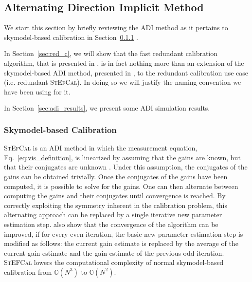 \documentclass[useAMS,usenatbib]{mn2e}
\begin{document}
\subsection{Alternating Direction Implicit Method}
\label{sec:adi}
We start this section by briefly reviewing the ADI method as it pertains to skymodel-based calibration in Section~\ref{sec:sbc} \citep{Salvini2014,Smirnov2015}.

In Section~\ref{sec:red_c}, we will show that the fast redundant calibration algorithm, that is presented in \citet{Marthi2014},
is in fact nothing more than an extension of the skymodel-based ADI method, presented in \citet{Salvini2014}, to the redundant calibration use case (i.e. redundant \textsc{StEfCal}).
In doing so we will justify the naming convention we have been using for it.

In Section~\ref{sec:adi_results}, we present some ADI simulation results. 

\subsubsection{Skymodel-based Calibration}
\label{sec:sbc}
\textsc{StEfCal} is an ADI method in which the measurement equation, Eq.~\eqref{eq:vis_definition}, is linearized by assuming that the gains are known, but
that their conjugates are unknown \citep{Mitchell:MWA-cal,Salvini2014}. Under this assumption, the conjugates of the gains can be obtained trivially. Once the conjugates of the gains have been computed, it is possible to solve for the gains. One can then alternate between computing the gains and their conjugates until convergence
is reached. By correctly exploiting the symmetry inherent in the calibration problem, this alternating approach can be replaced by a single iterative new parameter estimation step. \cite{Salvini2014} also show that
the convergence of the algorithm can be improved, if for every even iteration, the basic new parameter estimation step is modified as follows: the current gain estimate is replaced by the average of the current gain estimate and the gain estimate of the previous odd iteration.
\textsc{StEFCal} lowers the computational complexity of normal skymodel-based calibration from $\mathbb{O}(N^3)$ to $\mathbb{O}(N^2)$. 
\end{document}
